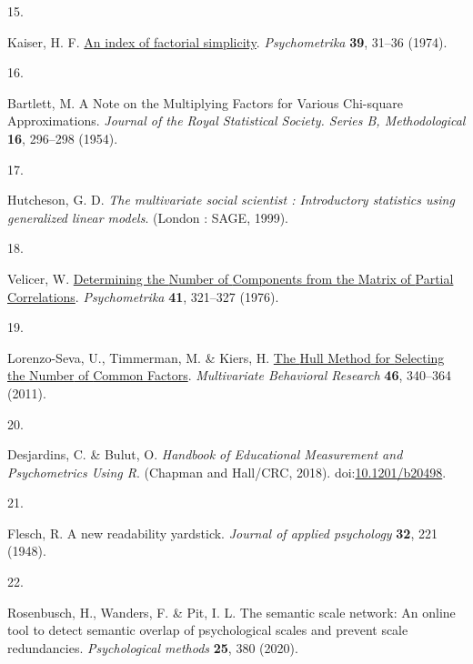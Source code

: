 \documentclass[
  man]{apa6}
\newlength{\cslhangindent}
\newlength{\csllabelwidth}
\newlength{\cslentryspacingunit} %
\newenvironment{CSLReferences}[2] %
 {%
  \setlength{\parindent}{0pt}
  \ifodd #1
  \let\oldpar\par
  \def\par{\hangindent=\cslhangindent\oldpar}
  \fi
  \setlength{\parskip}{#2\cslentryspacingunit}
 }%
 {}
\newcommand{\CSLLeftMargin}[1]{\parbox[t]{\csllabelwidth}{#1}}
\newcommand{\CSLRightInline}[1]{\parbox[t]{\linewidth - \csllabelwidth}{#1}\break}
\begin{document}
\begin{CSLReferences}{0}{0}
\leavevmode{}%
\CSLLeftMargin{15. }%
\CSLRightInline{Kaiser, H. F. \href{https://doi.org/10.1007/bf02291575}{An index of factorial simplicity}. \emph{Psychometrika} \textbf{39}, 31--36 (1974).}

\leavevmode{}%
\CSLLeftMargin{16. }%
\CSLRightInline{Bartlett, M. A {Note} on the {Multiplying Factors} for {Various Chi}-square {Approximations}. \emph{Journal of the Royal Statistical Society. Series B, Methodological} \textbf{16}, 296--298 (1954).}

\leavevmode{}%
\CSLLeftMargin{17. }%
\CSLRightInline{Hutcheson, G. D. \emph{The multivariate social scientist : Introductory statistics using generalized linear models}. ({London : SAGE}, 1999).}

\leavevmode{}%
\CSLLeftMargin{18. }%
\CSLRightInline{Velicer, W. \href{https://doi.org/10.1007/BF02293557}{Determining the {Number} of {Components} from the {Matrix} of {Partial Correlations}}. \emph{Psychometrika} \textbf{41}, 321--327 (1976).}

\leavevmode{}%
\CSLLeftMargin{19. }%
\CSLRightInline{Lorenzo-Seva, U., Timmerman, M. \& Kiers, H. \href{https://doi.org/10.1080/00273171.2011.564527}{The {Hull Method} for {Selecting} the {Number} of {Common Factors}}. \emph{Multivariate Behavioral Research} \textbf{46}, 340--364 (2011).}

\leavevmode{}%
\CSLLeftMargin{20. }%
\CSLRightInline{Desjardins, C. \& Bulut, O. \emph{Handbook of {Educational Measurement} and {Psychometrics Using R}}. ({Chapman and Hall/CRC}, 2018). doi:\href{https://doi.org/10.1201/b20498}{10.1201/b20498}.}

\leavevmode{}%
\CSLLeftMargin{21. }%
\CSLRightInline{Flesch, R. A new readability yardstick. \emph{Journal of applied psychology} \textbf{32}, 221 (1948).}

\leavevmode{}%
\CSLLeftMargin{22. }%
\CSLRightInline{Rosenbusch, H., Wanders, F. \& Pit, I. L. The semantic scale network: An online tool to detect semantic overlap of psychological scales and prevent scale redundancies. \emph{Psychological methods} \textbf{25}, 380 (2020).}


\end{CSLReferences}
\end{document}
